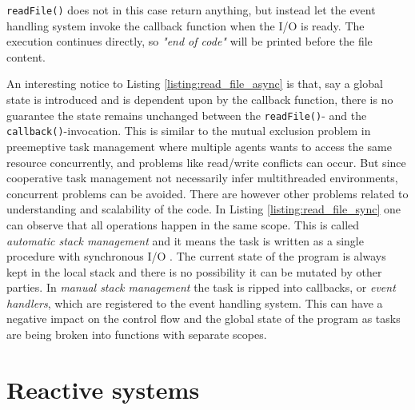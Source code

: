 

\lstinline{readFile()} does not in this case return anything, but instead let
the event handling system invoke the callback function when the I/O is ready.
The execution continues directly, so \textit{"end of code"} will be printed
before the file content.

An interesting notice to Listing \ref{listing:read_file_async} is that, say a
global state is introduced and is dependent upon by the callback function,
there is no guarantee the state remains unchanged between the
\lstinline{readFile()}- and the \lstinline{callback()}-invocation. This is
similar to the mutual exclusion problem in preemeptive task management where
multiple agents wants to access the same resource concurrently, and problems
like read/write conflicts can occur. But since cooperative task management not
necessarily infer multithreaded environments, concurrent problems can be
avoided. There are however other problems related to understanding and
scalability of the code. In Listing \ref{listing:read_file_sync} one can
observe that all operations happen in the same scope. This is called
\textit{automatic stack management} and it means the task is written as a
single procedure with synchronous I/O \cite{adya2002cooperative}. The current
state of the program is always kept in the local stack and there is no
possibility it can be mutated by other parties. In \textit{manual stack
management} the task is ripped into callbacks, or \textit{event handlers},
which are registered to the event handling system. This can have a negative
impact on the control flow and the global state of the program as tasks are
being broken into functions with separate scopes.


\section{Reactive systems}

